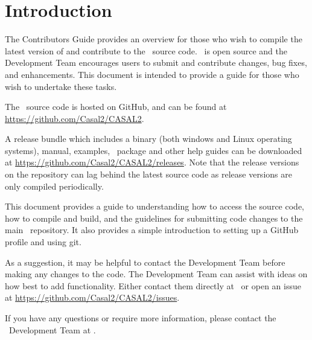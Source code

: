 \section{Introduction\label{sec:Introduction}}

The Contributors Guide provides an overview for those who wish to compile the latest version of \CNAME and contribute to the \CNAME\ source code. \CNAME\ is open source and the Development Team encourages users to submit and contribute changes, bug fixes, and enhancements. This document is intended to provide a guide for those who wish to undertake these tasks. 

The \CNAME\ source code is hosted on GitHub, and can be found at \url{https://github.com/Casal2/CASAL2}.

A release bundle which includes a binary (both windows and Linux operating systems), manual, examples, \R\  package and other help guides can be downloaded at \url{https://github.com/Casal2/CASAL2/releases}. Note that the release versions on the repository can lag behind the latest source code as release versions are only compiled periodically. 

This document provides a guide to understanding how to access the source code, how to compile and build, and the guidelines for submitting code changes to the main \CNAME\ repository. It also provides a simple introduction to setting up a GitHub profile and using git. 

As a suggestion, it may be helpful to contact the Development Team before making any changes to the code. The Development Team can assist with ideas on how best to add functionality. Either contact them directly at \emaillink\ or open an issue at \url{https://github.com/Casal2/CASAL2/issues}. 

If you have any questions or require more information, please contact the \CNAME\ Development Team at \emaillink.